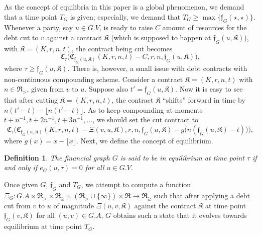 \documentclass[10pt]{article}
\newcommand{\RR}{\mathfrak{R}}
\newcommand{\KK}{\mathfrak{K}}
\newcommand{\CC}{\mathfrak{C}}
\newcommand{\ff}{\mathfrak{f}}
\newtheorem{mydef}{Definition}
\begin{document}
As the concept of equilibria in this paper is a global phenomenon, we demand that a time point $T_G$ is given; especially, we demand that $T_G \geq \max \{ \ff_G(\star, \star) \}$. Whenever a party, say $u \in G.V$, is ready to raise $C$ amount of resources for the debt cut to $v$ against a contract $\KK$ (which is supposed to happen at $\ff_G(u, \KK)$), with $\KK = (K, r, n, t)$, the contract being cut becomes 
\[
\CC_{\tau}\big(\CC_{\ff_G(u, \KK)}(K, r, n, t) - C, r, n, \ff_G(u, \KK) \big),
\]
where $\tau \geq \ff_G(u, \KK)$.
There is, however, a small issue with debt contracts with non-continuous compounding scheme. Consider a contract $\KK = (K, r, n, t)$ with $n \in \RR_>$, given from $v$ to $u$. Suppose also $t' = \ff_G(u, \KK).$ Now it is easy to see that after cutting $\KK = (K, r, n, t)$, the contract $\KK$ ``shifts'' forward in time by $n(t' - t) - \lfloor n(t' - t) \rfloor$. As to keep compounding at moments $t + n^{-1}, t + 2n^{-1}, t + 3n^{-1}, \dots$, we should set the cut contract to 
\[
\CC_{\tau}\bigg( \CC_{\ff_G(u, \KK)}(K, r, n, t) - \Xi(v, u, \KK), r, n, \ff_G(u, \KK) - g \Big(n(\ff_G(u, \KK) - t) \Big) \bigg),
\]
where $g(x) = x - \lfloor x \rfloor$. Next, we define the concept of equilibrium.
\begin{mydef}
The financial graph $G$ is said to be in equilibrium at time point $\tau$ if and only if $e_G(u,\tau) = 0$ for all $u \in G.V$.
\end{mydef}
Once given $G$, $\ff_G$ and $T_G$, we attempt to compute a function $\Xi_G \colon G.A \times \RR_> \times \RR_{\geq} \times (\RR_> \cup \{ \infty \}) \times \RR \to \RR_{\geq}$ such that after applying a debt cut from $v$ to $u$ of magnitude $\Xi(u, v, \KK)$ against the contract $\KK$ at time point $\ff_G(v, \KK)$ for  all $(u, v) \in G.A$, $G$ obtains such a state that it evolves towards equilibrium at time point $T_G$.
\end{document}
